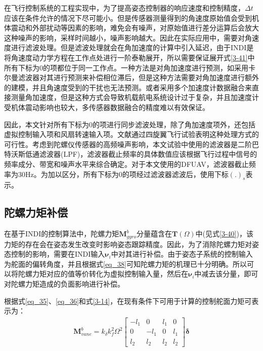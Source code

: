 在飞行控制系统的工程实现中，为了提高姿态控制器的响应速度和控制精度，$\Delta t$应该在条件允许的情况下尽可能小。但是传感器测量得到的角速度原始值会受到机体震动和外部扰动等因素的影响，难免会有噪声，对原始值进行差分运算后会放大这种噪声的影响，采样时间越小，噪声影响越大。因此在实际应用中，需要对角速度进行滤波处理。但是滤波处理就会在角加速度的计算中引入延迟，由于INDI是将角速度动力学方程在工作点处进行一阶泰勒展开，所以需要保证展开式\eqref{3-41}中所有下标为0的项都位于同一工作点。一种方法是对角加速度进行预测，如采用卡尔曼滤波器对其进行预测来补偿相位滞后，但是这种方法需要对角加速度进行额外的建模，并且角速度受到的干扰也无法预测。或者采用多个加速度计数据融合来直接测量角加速度，但是这种方式会导致机载航电系统设计过于复杂，并且加速度计受机体震动影响也较大，多传感器数据融合的精度难以有效保证。

因此，本文针对所有下标为0的项进行同步滤波处理，除了角加速度项外，还包括虚拟控制输入项和风扇转速输入项。文献\parencite{smeur2016adaptive,smeurCascadedIncrementalNonlinear2018b}通过四旋翼飞行试验表明这种处理方式的可行性。考虑到陀螺仪传感器的高频噪声影响，本文试验中使用的滤波器是二阶巴特沃斯低通滤波器(LPF)，滤波器截止频率的具体数值应该根据飞行过程中信号的频率成分、带宽和噪声水平来综合确定。对于本文使用的DFUAV，滤波器截止频率为30Hz。为加以区分，所有下标为0的项经过滤波器滤波后，使用下标$(.)_s$表示。

\subsection{陀螺力矩补偿}

在基于INDI的控制算法中，陀螺力矩$\boldsymbol{M}_{gyro}^b$分量蕴含在$\boldsymbol{T}(\Omega)$中(见式\eqref{3-40})，该力矩的存在会在姿态发生改变时影响姿态跟踪精度。因此，为了消除陀螺力矩对姿态控制的影响，需要在INDI输入$\boldsymbol{\nu}_i$中对其进行补偿。由于姿态子系统的控制输入为舵面的偏转角度，并且根据式\eqref{eq_38}可知陀螺力矩的机理已十分明确。所以可以将陀螺力矩对应的值等价转化为虚拟控制输入量，然后在$\boldsymbol{\nu}_i$中减去该分量，即可对陀螺力矩造成的负面影响进行补偿。

根据式\eqref{eq_35}、\eqref{eq_36}和式\eqref{3-14}，在现有条件下可用于计算的控制舵面力矩可表示为：
\begin{gather}
    \boldsymbol{M}_{vane}^b=k_{\delta}k_f^2\Omega^2\begin{bmatrix}
        -l_1 & 0 & l_1 & 0 \\
        0 & -l_1 & 0 & l_1 \\
        l_2 & l_2 & l_2 & l_2
        \end{bmatrix}\boldsymbol{{\delta}}
    \label{3-50}
\end{gather}

